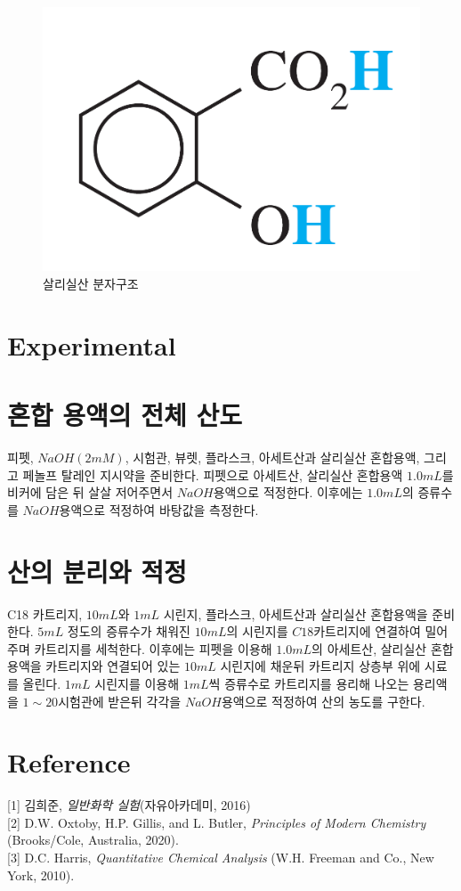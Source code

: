 \documentclass[%
 reprint,
 amsmath,amssymb,
 aps,
]{revtex4-2}
\begin{document}
\begin{figure}[htbp]
	\includegraphics[width = 0.6\linewidth]{saly.png}%
	\caption{\label{fig:saly}살리실산 분자구조}
\end{figure}

\section{\label{sec:level1}Experimental}
\section{\label{sec:level2}혼합 용액의 전체 산도}
피펫, $NaOH (2mM)$, 시험관, 뷰렛, 플라스크, 아세트산과 살리실산 혼합용액, 그리고 페놀프 탈레인 지시약을 준비한다. 피펫으로 아세트산, 살리실산 혼합용액 $1.0mL$를 비커에 담은 뒤 살살 저어주면서 $NaOH$용액으로 적정한다. 이후에는 $1.0mL$의 증류수를 $NaOH$용액으로 적정하여 바탕값을 측정한다.

\section{\label{sec:level2}산의 분리와 적정}
C18 카트리지, $10mL$와 $1mL$ 시린지, 플라스크, 아세트산과 살리실산 혼합용액을 준비한다. $5mL$ 정도의 증류수가 채워진 $10mL$의 시린지를 $C18$카트리지에 연결하여 밀어주며 카트리지를 세척한다. 이후에는 피펫을 이용해 $1.0mL$의 아세트산, 살리실산 혼합용액을 카트리지와 연결되어 있는 $10mL$ 시린지에 채운뒤 카트리지 상층부 위에 시료를 올린다. $1mL$ 시린지를 이용해 $1mL$씩 증류수로 카트리지를 용리해 나오는 용리액을 $1\sim 20$시험관에 받은뒤 각각을 $NaOH$용액으로 적정하여 산의 농도를 구한다.

\section{\label{sec:level1}Reference}
[1] 김희준, \textit{일반화학 실험}(자유아카데미, 2016)\\

[2] D.W. Oxtoby, H.P. Gillis, and L. Butler, \textit{Principles of Modern Chemistry} (Brooks/Cole, Australia, 2020). \\

[3] D.C. Harris, \textit{Quantitative Chemical Analysis} (W.H. Freeman and Co., New York, 2010). 
\end{document}
